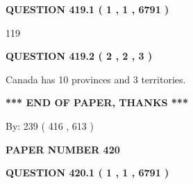 \documentclass[12pt]{article}
\begin{document}
   
  
\vspace{0.2in}
  
{\textbf{\Large{QUESTION
419.1 
 ( 1 , 1 , 6791 )
}}}
  
  
 
 
\noindent{}

119
 
 
  
\vspace{0.2in}
  
{\textbf{\Large{QUESTION
419.2 
 ( 2 , 2 , 3 )
}}}
  
  
 
 
\noindent{}
 
 
Canada has 10  provinces and 3 territories.
 
 
 
 
   
   
 \vspace{0.2in}
 
   
   
   
   
\vspace{1.0in} 
{\textbf{\large{ *** END OF PAPER, THANKS *** }}} 
   
   
\hspace{1.0in} By: 
 239 ( 416 ,  613 )
   
   
   
   
\newpage 
\setcounter{page}{ 
   420001 } 
   
   
   
   
 {\textbf{ \Large{ PAPER NUMBER  420  }}}
   
   
\vspace{0.2in}
   
   
   
   
   
   
 \vspace{0.2in}
 
 
 
 
   
   
  
\vspace{0.2in}
  
{\textbf{\Large{QUESTION
420.1 
 ( 1 , 1 , 6791 )
}}}
  
\end{document}
